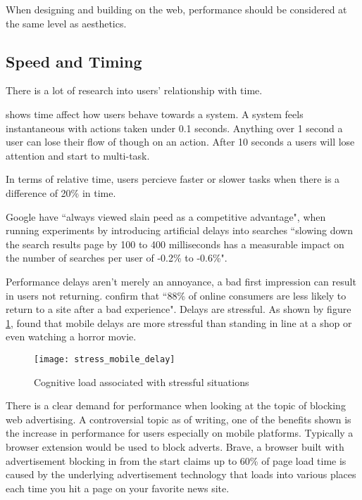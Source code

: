 When designing and building on the web, performance should be considered at the same level as aesthetics. \cite{performance_is_ux}

\subsection{Speed and Timing} \label{l-r--speed}

There is a lot of research into users' relationship with time.

\cite{usability_engineering} shows time affect how users behave towards a system. A system feels instantaneous with actions taken under 0.1 seconds. Anything over 1 second a user can lose their flow of though on an action. After 10 seconds a users will lose attention and start to multi-task.

In terms of relative time, users percieve faster or slower tasks when there is a difference of 20\% in time. \cite{setting_a_performance_budget}

Google have ``always viewed slain peed as a competitive advantage", when running experiments by introducing artificial delays into searches ``slowing down the search results page by 100 to 400 milliseconds has a measurable impact on the number of searches per user of -0.2\% to -0.6\%". \cite{speed_matters}

Performance delays aren't merely an annoyance, a bad first impression can result in users not returning. \cite{why_web_performance_matters} confirm that ``88\% of online consumers are less likely to return to a site after a bad experience". Delays are stressful. As shown by figure \ref{figure-stress-mobile-delay}, \cite{ericsson} found that mobile delays are more stressful than standing in line at a shop or even watching a horror movie.

\begin{figure}[H]
  \centering
    \texttt{[image: stress\_mobile\_delay]}
  \caption{Cognitive load associated with stressful situations \protect\cite{ericsson}}
  \label{figure-stress-mobile-delay}
\end{figure}

There is a clear demand for performance when looking at the topic of blocking web advertising. A controversial topic as of writing, one of the benefits shown is the increase in performance for users especially on mobile platforms. Typically a browser extension would be used to block adverts. Brave, a browser built with advertisement blocking in from the start claims up to 60\% of page load time is caused by the underlying advertisement technology that loads into various places each time you hit a page on your favorite news site. \cite{brave}

